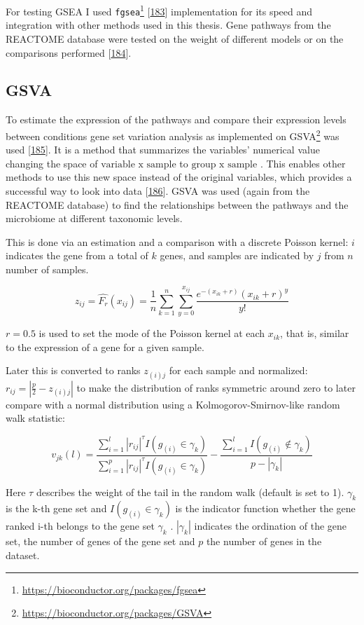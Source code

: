 \documentclass[
  a4paper,
]{book}
\DeclareRobustCommand{\href}[2]{#2\footnote{\url{#1}}}
\begin{document}
For testing GSEA I used \href{https://bioconductor.org/packages/fgsea}{\texttt{fgsea}} {[}\protect\hyperlink{ref-korotkevich2021}{183}{]} implementation for its speed and integration with other methods used in this thesis.
Gene pathways from the REACTOME database were tested on the weight of different models or on the comparisons performed {[}\protect\hyperlink{ref-fabregat2016}{184}{]}.

\hypertarget{gsva}{%
\subsection{GSVA}\label{gsva}}

To estimate the expression of the pathways and compare their expression levels between conditions gene set variation analysis as implemented on \href{https://bioconductor.org/packages/GSVA}{GSVA} was used {[}\protect\hyperlink{ref-huxe4nzelmann2013}{185}{]}.
It is a method that summarizes the variables' numerical value changing the space of \(\text{variable x sample}\) to \(\text{group x sample}\) .
This enables other methods to use this new space instead of the original variables, which provides a successful way to look into data {[}\protect\hyperlink{ref-escudero-hernuxe1ndez2021}{186}{]}.
GSVA was used (again from the REACTOME database) to find the relationships between the pathways and the microbiome at different taxonomic levels.

This is done via an estimation and a comparison with a discrete Poisson kernel: \(i\) indicates the gene from a total of \(k\) genes, and samples are indicated by \(j\) from \(n\) number of samples.

\[
z_{ij}=\hat{F_r}(x_{ij}) = \frac{1}{n}\sum_{k=1}^n\sum_{y=0}^{x_{ij}}\dfrac{e^{-(x_{ik}+r)}(x_{ik} + r)^y }{y!}
\]

\(r = 0.5\) is used to set the mode of the Poisson kernel at each \(x_{ik}\), that is, similar to the expression of a gene for a given sample.

Later this is converted to ranks \(z_{(i)j}\) for each sample and normalized: \(r_{ij}=|\frac{p}{2}-z_{(i)j}|\) to make the distribution of ranks symmetric around zero to later compare with a normal distribution using a Kolmogorov-Smirnov-like random walk statistic:

\[
v_{jk}(l)=\dfrac{\sum_{i=1}^l|r_{ij}|^{\tau}I(g_{(i)}\in \gamma_k)}{\sum_{i=1}^p|r_{ij}|^{\tau}I(g_{(i)} \in \gamma_k)}
- \dfrac{\sum_{i=1}^lI(g_{(i)} \not \in\gamma_k)}{p-|\gamma_k|}
\]

Here \(\tau\) describes the weight of the tail in the random walk (default is set to 1).
\(\gamma_k\) is the k-th gene set and \(I(g_{(i)}\in \gamma_k)\) is the indicator function whether the gene ranked i-th belongs to the gene set \(\gamma_k\) .
\(|\gamma_k|\) indicates the ordination of the gene set, the number of genes of the gene set and \(p\) the number of genes in the dataset.
\end{document}
